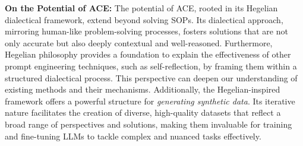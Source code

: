 \textbf{On the Potential of ACE:} 
The potential of ACE, rooted in its Hegelian dialectical framework, extend beyond solving SOPs. Its dialectical approach, mirroring human-like problem-solving processes, fosters solutions that are not only accurate but also deeply contextual and well-reasoned. Furthermore, Hegelian philosophy provides a foundation to explain the effectiveness of other prompt engineering techniques, such as self-reflection, by framing them within a structured dialectical process. This perspective can deepen our understanding of existing methods and their mechanisms.
Additionally, the Hegelian-inspired framework offers a powerful structure for \textit{generating synthetic data}. Its iterative nature facilitates the creation of diverse, high-quality datasets that reflect a broad range of perspectives and solutions, making them invaluable for training and fine-tuning LLMs to tackle complex and nuanced tasks effectively.

